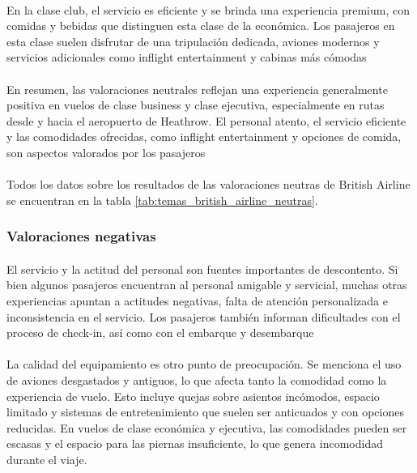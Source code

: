 \documentclass{report}
\begin{document}
{                    \paragraph*{}{
                        En la clase club, el servicio es eficiente y se brinda una experiencia premium, con comidas y bebidas que distinguen esta clase de la económica. Los pasajeros en esta clase suelen disfrutar de una tripulación dedicada, aviones modernos y servicios adicionales como inflight entertainment y cabinas más cómodas
                    }
                    \paragraph*{}{
                        En resumen, las valoraciones neutrales reflejan una experiencia generalmente positiva en vuelos de clase business y clase ejecutiva, especialmente en rutas desde y hacia el aeropuerto de Heathrow. El personal atento, el servicio eficiente y las comodidades ofrecidas, como inflight entertainment y opciones de comida, son aspectos valorados por los pasajeros
                    }
                    \paragraph*{}{
                        Todos los datos sobre los resultados de las valoraciones neutras de British Airline se encuentran en la tabla \ref{tab:temas_british_airline_neutras}.
                    }
                \subsubsection*{Valoraciones negativas}
                    \paragraph*{}{
                        El servicio y la actitud del personal son fuentes importantes de descontento. Si bien algunos pasajeros encuentran al personal amigable y servicial, muchas otras experiencias apuntan a actitudes negativas, falta de atención personalizada e inconsistencia en el servicio. Los pasajeros también informan dificultades con el proceso de check-in, así como con el embarque y desembarque
                    }
                    \paragraph*{}{
                        La calidad del equipamiento es otro punto de preocupación. Se menciona el uso de aviones desgastados y antiguos, lo que afecta tanto la comodidad como la experiencia de vuelo. Esto incluye quejas sobre asientos incómodos, espacio limitado y sistemas de entretenimiento que suelen ser anticuados y con opciones reducidas. En vuelos de clase económica y ejecutiva, las comodidades pueden ser escasas y el espacio para las piernas insuficiente, lo que genera incomodidad durante el viaje.
                    }
}
\end{document}

